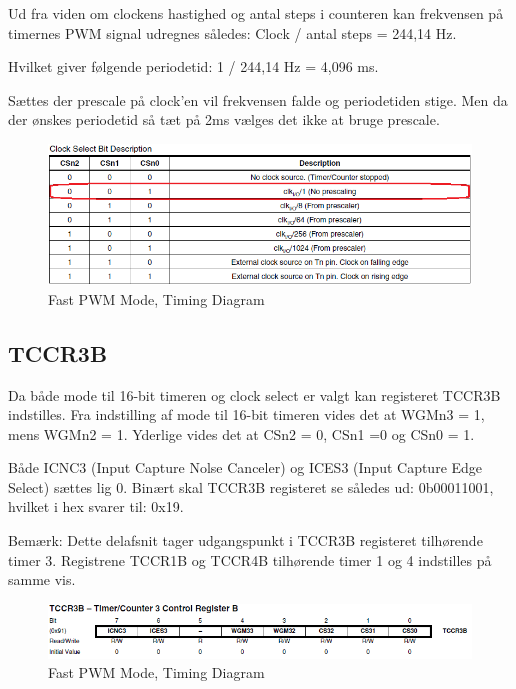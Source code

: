 Ud fra viden om clockens hastighed og antal steps i counteren kan frekvensen på timernes PWM signal udregnes således: Clock / antal steps = 244,14 Hz.  

Hvilket giver følgende periodetid: 1 / 244,14 Hz = 4,096 ms.

Sættes der prescale på clock’en vil frekvensen falde og periodetiden stige. Men da der ønskes periodetid så tæt på 2ms vælges det ikke at bruge prescale. 

\begin{figure}[H]
	\centering
	\includegraphics[width=1.\textwidth]{Billeder/Timer/4_CS.png}
	\caption{Fast PWM Mode, Timing Diagram}
	\label{fig:Timing_diagram}
\end{figure}
  

\subsection*{TCCR3B}
Da både mode til 16-bit timeren og clock select er valgt kan registeret TCCR3B indstilles. Fra indstilling af mode til 16-bit timeren vides det at WGMn3 = 1, mens WGMn2 = 1. Yderlige vides det at CSn2 = 0, CSn1 =0 og CSn0 = 1. 

Både ICNC3 (Input Capture Nolse Canceler) og ICES3 (Input Capture Edge Select) sættes lig 0.
Binært skal TCCR3B registeret se således ud: 0b00011001, hvilket i hex svarer til: 0x19. 

Bemærk: Dette delafsnit tager udgangspunkt i TCCR3B registeret tilhørende timer 3.  Registrene TCCR1B og TCCR4B tilhørende timer 1 og 4 indstilles på samme vis.

\begin{figure}[H]
	\centering
	\includegraphics[width=1.\textwidth]{Billeder/Timer/5_TCCT3B.png}
	\caption{Fast PWM Mode, Timing Diagram}
	\label{fig:Timing_diagram}
\end{figure}



